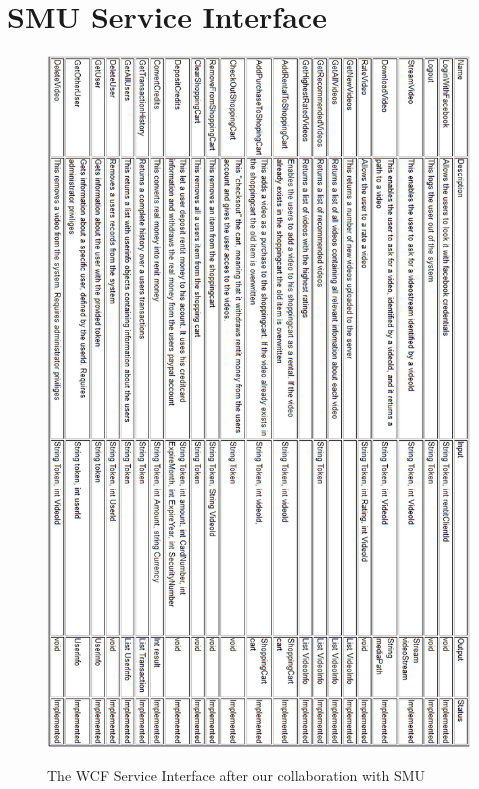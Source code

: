\section{SMU Service Interface}

\begin{figure}[H]
\centering
\includegraphics[scale=0.6]{SMUServiceInterface.png}
\label{SMUServiceInterface}
\caption{The WCF Service Interface after our collaboration with SMU}
\end{figure}